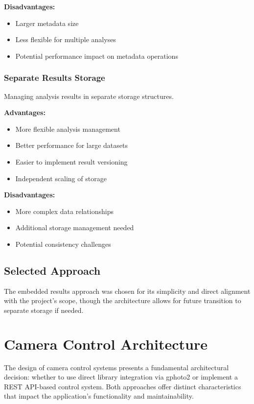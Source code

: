 \textbf{Disadvantages:}
\begin{itemize}
    \item Larger metadata size
    \item Less flexible for multiple analyses
    \item Potential performance impact on metadata operations
\end{itemize}

\subsubsection{Separate Results Storage}
Managing analysis results in separate storage structures.

\textbf{Advantages:}
\begin{itemize}
    \item More flexible analysis management
    \item Better performance for large datasets
    \item Easier to implement result versioning
    \item Independent scaling of storage
\end{itemize}

\textbf{Disadvantages:}
\begin{itemize}
    \item More complex data relationships
    \item Additional storage management needed
    \item Potential consistency challenges
\end{itemize}

\subsection{Selected Approach}
The embedded results approach was chosen for its simplicity and direct alignment with the project's scope, though the architecture allows for future transition to separate storage if needed.

\section{Camera Control Architecture}

The design of camera control systems presents a fundamental architectural decision: whether to use direct library integration via gphoto2 or implement a REST API-based control system. Both approaches offer distinct characteristics that impact the application's functionality and maintainability.

